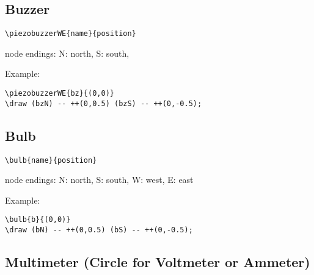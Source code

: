 \documentclass[parskip=full]{scrartcl}
\begin{document}
\subsection{Buzzer}

\begin{verbatim}
\piezobuzzerWE{name}{position}
\end{verbatim}
node endings: N: north, S: south,

Example:\\
\begin{minipage}{0.8\textwidth}
\begin{verbatim}
\piezobuzzerWE{bz}{(0,0)}
\draw (bzN) -- ++(0,0.5) (bzS) -- ++(0,-0.5);
\end{verbatim}
\end{minipage}
\begin{minipage}{0.19\textwidth}
\end{minipage}

\subsection{Bulb}

\begin{verbatim}
\bulb{name}{position}
\end{verbatim}
node endings: N: north, S: south, W: west, E: east

Example:\\
\begin{minipage}{0.8\textwidth}
\begin{verbatim}
\bulb{b}{(0,0)}
\draw (bN) -- ++(0,0.5) (bS) -- ++(0,-0.5);
\end{verbatim}
\end{minipage}
\begin{minipage}{0.19\textwidth}
\end{minipage}

\subsection{Multimeter (Circle for Voltmeter or Ammeter)}
\end{document}

